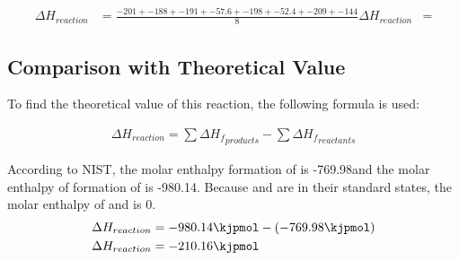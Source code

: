 \documentclass[demo, 12pt, notitlepage, letterpaper]{report}
\begin{document}
\begin{align*}
	\Delta H_{reaction} & = \frac{-201 + -188 + -191 + -57.6 + -198 + -52.4 + -209 + -144}{8}
	\Delta H_{reaction} & =
\end{align*}

\subsection*{Comparison with Theoretical Value}
To find the theoretical value of this reaction, the following formula is used:

\begin{align*}
	\Delta H_{reaction} = \sum \Delta {H_f}_{products} - \sum \Delta {H_f}_{reactants}
\end{align*}

According to NIST, the molar enthalpy formation of  is -769.98\kjpmol and the molar enthalpy of formation of  is -980.14\kjpmol . Because  and  are in their standard states, the molar enthalpy of  and  is 0\kjpmol .
\begin{align*}
	\Delta H_{reaction} & = -980.14\kjpmol - (-769.98\kjpmol) \\
	\Delta H_{reaction} & = -210.16\kjpmol
\end{align*}

\end{document}
